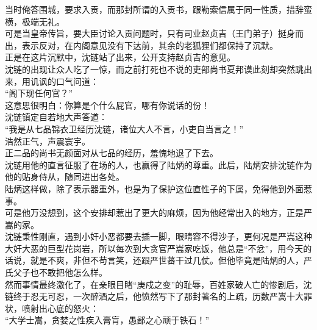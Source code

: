 \begin{multicols}{\theparacolNo}
当时俺答围城，要求入贡，而那封所谓的入贡书，跟勒索信属于同一性质，措辞蛮横，极端无礼。\\

可是当皇帝传旨，要大臣讨论入贡问题时，只有司业赵贞吉（王门弟子）挺身而出，表示反对，在内阁意见没有下达前，其余的老狐狸们都保持了沉默。\\

正是在这片沉默中，沈链站了出来，公开支持赵贞吉的意见。\\

沈链的出现让众人吃了一惊，而之前打死也不说的吏部尚书夏邦谟此刻却突然跳出来，用讥讽的口气问道：\\

“阁下现任何官？”\\

这意思很明白：你算是个什么屁官，哪有你说话的份！\\

沈链镇定自若地大声答道：\\

“我是从七品锦衣卫经历沈链，诸位大人不言，小吏自当言之！”\\

浩然正气，声震寰宇。\\

正二品的尚书无颜面对从七品的经历，羞愧地退了下去。\\

沈链用他的直言征服了在场的人，也赢得了陆炳的尊重。此后，陆炳安排沈链作为他的贴身侍从，随同进出各处。\\

陆炳这样做，除了表示器重外，也是为了保护这位直性子的下属，免得他到外面惹事。\\

可是他万没想到，这个安排却惹出了更大的麻烦，因为他经常出入的地方，正是严嵩的家。\\

沈链秉性刚直，遇到小奸小恶都要去插一脚，眼睛容不得沙子，更何况是严嵩这种大奸大恶的巨型花岗岩，所以每次到大贪官严嵩家吃饭，他总是“不忿”，用今天的话说，就是不爽，非但不苟言笑，还跟严世蕃干过几仗。但他毕竟是陆炳的人，严氏父子也不敢把他怎么样。\\

然而事情最终激化了，在亲眼目睹“庚戍之变”的耻辱，百姓家破人亡的惨剧后，沈链终于忍无可忍，一次醉酒之后，他愤然写下了那封著名的上疏，历数严嵩十大罪状，喷射出心底的怒火：\\

“大学士嵩，贪婪之性疾入膏肓，愚鄙之心顽于铁石！”\\


\end{multicols}
